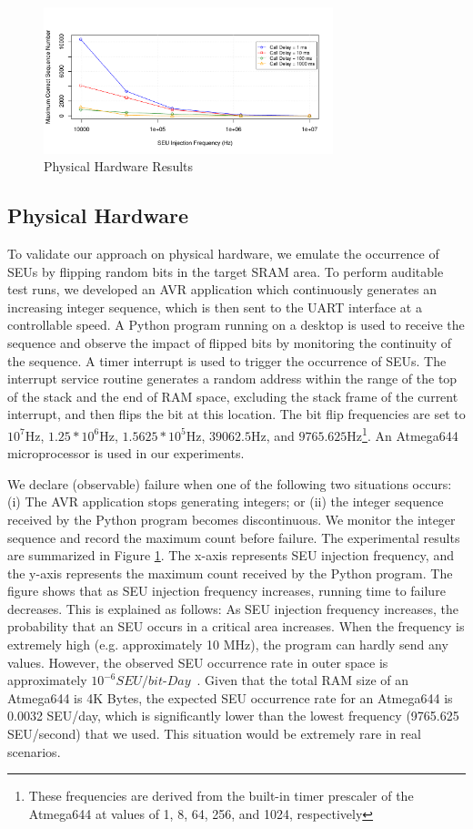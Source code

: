 \begin{figure}[h]
	\centering
	\includegraphics[width=0.75\textwidth]{figures/experiment1.pdf}
	\caption{Physical Hardware Results}
	\vspace{5pt}
	\label{fig:exp1_result}
\end{figure}
\subsection{Physical Hardware}
To validate our approach on physical hardware, we emulate the occurrence of SEUs by flipping random bits in the target SRAM area. To perform auditable test runs, we developed an AVR application which continuously generates an increasing integer sequence, which is then sent to the UART interface at a controllable speed. A Python program running on a desktop is used to receive the sequence and observe the impact of flipped bits by monitoring the continuity of the sequence. A timer interrupt is used to trigger the occurrence of SEUs. The interrupt service routine generates a random address within the range of the top of the stack and the end of RAM space, excluding the stack frame of the current interrupt, and then flips the bit at this location. The bit flip frequencies are set to $10^7$Hz, $1.25*10^6$Hz, $1.5625*10^5$Hz, $39062.5$Hz, and $9765.625$Hz\footnote{These frequencies are derived from the built-in timer prescaler of the Atmega644 at values of 1, 8, 64, 256, and 1024, respectively}. An Atmega644 microprocessor is used in our experiments.

We declare (observable) failure when one of the following two situations occurs: (i) The AVR application stops generating integers; or (ii) the integer sequence received by the Python program becomes discontinuous. We monitor the integer sequence and record the maximum count before failure. The experimental results are summarized in Figure \ref{fig:exp1_result}. The x-axis represents SEU injection frequency, and the y-axis represents the maximum count received by the Python program. The figure shows that as SEU injection frequency increases, running time to failure decreases. This is explained as follows: As SEU injection frequency increases, the probability that an SEU occurs in a critical area increases. When the frequency is extremely high (e.g. approximately 10 MHz), the program can hardly send any values. However, the observed SEU occurrence rate in outer space is approximately $10^{-6}SEU/bit$-$Day$~\cite{underwood1992observations}. Given that the total RAM size of an Atmega644 is 4K Bytes, the expected SEU occurrence rate for an Atmega644 is 0.0032 SEU/day, which is significantly lower than the lowest frequency (9765.625 SEU/second) that we used. This situation would be extremely rare in real scenarios.

